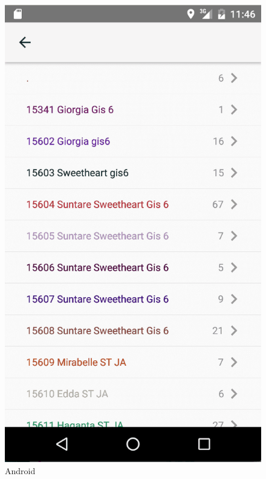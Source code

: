 \documentclass[12pt]{article}
\begin{document}
\begin{figure}[ht]
	\includegraphics[width=\linewidth, height=0.4\textheight, keepaspectratio=true, frame]{screenshots/RecordsAnd.png}
	\caption{Android}
	\endminipage\hfill
\end{figure}
\clearpage
\end{document}
